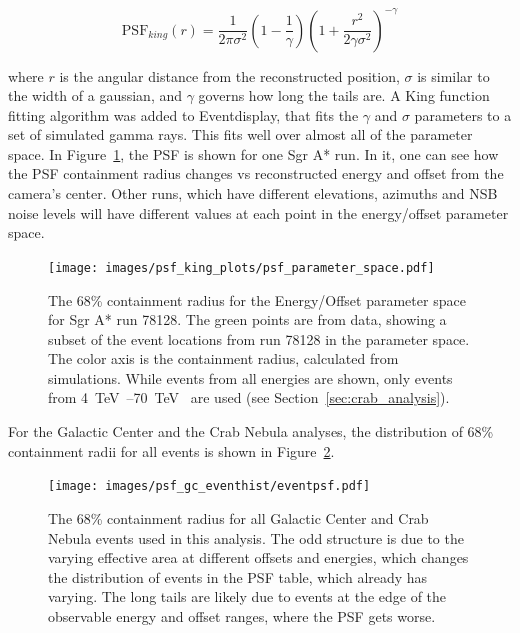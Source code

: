     \begin{equation} \label{eqn:king}
    \text{PSF}_{king}(r) = \frac{1}{2 \pi \sigma^{2} } \left( 1 - \frac{1}{\gamma} \right) \left( 1 + \frac{ r^{2} }{ 2 \gamma \sigma^{2} } \right)^{-\gamma}
    \end{equation}

    where $r$ is the angular distance from the reconstructed position, $\sigma$ is similar to the width of a gaussian, and $\gamma$ governs how long the tails are.
    A King function fitting algorithm was added to Eventdisplay, that fits the $\gamma$ and $\sigma$ parameters to a set of simulated gamma rays.
    This fits well over almost all of the parameter space.
    In Figure~\ref{fig:psf_paramspace}, the PSF is shown for one Sgr A* run.
    In it, one can see how the PSF containment radius changes vs reconstructed energy and offset from the camera's center.
    Other runs, which have different elevations, azimuths and NSB noise levels will have different values at each point in the energy/offset parameter space.

    \begin{figure}[!ht]
      \centering
      \texttt{[image: images/psf\_king\_plots/psf\_parameter\_space.pdf]}
      \caption[PSF Parameter Space]{
        The 68\% containment radius for the Energy/Offset parameter space for Sgr A* run 78128. 
        The green points are from data, showing a subset of the event locations from run 78128 in the parameter space.
        The color axis is the containment radius, calculated from simulations.
        While events from all energies are shown, only events from \SIrange{4}{70}{\TeV{}} are used (see Section~\ref{sec:crab_analysis}).
      }
      \label{fig:psf_paramspace}
    \end{figure}

    For the Galactic Center and the Crab Nebula analyses, the distribution of 68\% containment radii for all events is shown in Figure~\ref{fig:gc_psf_hist}.

    \begin{figure}[!hb]
      \centering
      \texttt{[image: images/psf\_gc\_eventhist/eventpsf.pdf]}
      \caption[Crab and Galactic Center Event PSFs]{
        The 68\% containment radius for all Galactic Center and Crab Nebula events used in this analysis.
        The odd structure is due to the varying effective area at different offsets and energies, which changes the distribution of events in the PSF table, which already has varying.
        The long tails are likely due to events at the edge of the observable energy and offset ranges, where the PSF gets worse.
      }
      \label{fig:gc_psf_hist}
    \end{figure}
  
